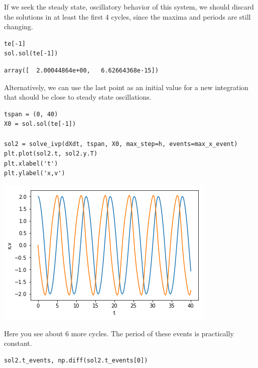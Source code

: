 \documentclass[11pt]{article}
\begin{document}
If we seek the steady state, oscillatory behavior of this system, we should discard the solutions in at least the first 4 cycles, since the maxima and periods are still changing.

\begin{verbatim}
te[-1]
sol.sol(te[-1])
\end{verbatim}

\begin{verbatim}
array([  2.00044864e+00,   6.62664368e-15])
\end{verbatim}

Alternatively, we can use the last point as an initial value for a new integration that should be close to steady state oscillations.

\begin{verbatim}
tspan = (0, 40)
X0 = sol.sol(te[-1])

sol2 = solve_ivp(dXdt, tspan, X0, max_step=h, events=max_x_event)
plt.plot(sol2.t, sol2.y.T)
plt.xlabel('t')
plt.ylabel('x,v')
\end{verbatim}

\begin{center}
\includegraphics[width=.9\linewidth]{obipy-resources/c515c00ecd6370edf5b32608ff70731e-38847djd.png}
\end{center}

Here you see about 6 more cycles. The period of these events is practically constant.

\begin{verbatim}
sol2.t_events, np.diff(sol2.t_events[0])
\end{verbatim}
\end{document}
